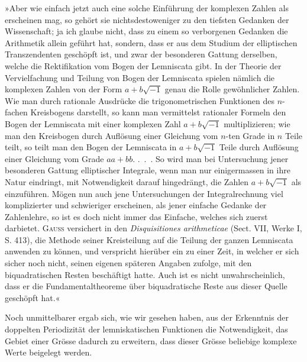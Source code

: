 »Aber wie einfach jetzt auch eine solche Einführung der komplexen Zahlen
als  erscheinen mag, so gehört sie nichtsdestoweniger zu den tiefsten
Gedanken der Wissenschaft; ja ich glaube nicht, dass zu einem so verborgenen
Gedanken die Arithmetik allein geführt hat, sondern, dass er aus dem Studium
der elliptischen Transzendenten geschöpft ist, und zwar der besonderen Gattung
derselben, welche die Rektifikation vom Bogen der Lemniscata gibt. In der
Theorie der Vervielfachung und Teilung von Bogen der Lemniscata spielen
nämlich die komplexen Zahlen von der Form \(a+b\sqrt{-1}\) genau die Rolle gewöhnlicher
Zahlen. Wie man durch rationale Ausdrücke die trigonometrischen
Funktionen des \(n\)-fachen Kreisbogens darstellt, so kann man vermittelst rationaler
Formeln den Bogen der Lemniscata mit einer komplexen Zahl \(a+b\sqrt{-1}\)
multiplizieren; wie man den Kreisbogen durch Auflösung einer Gleichung
vom \(n\)-ten Grade in \(n\) Teile teilt, so teilt man den Bogen der Lemniscata in
\(a+b\sqrt{-1}\) Teile durch Auflösung einer Gleichung vom Grade \(aa+bb\). .\ .\ .
So wird man bei Untersuchung jener besonderen Gattung elliptischer Integrale,
wenn man nur einigermassen in ihre Natur eindringt, mit Notwendigkeit
darauf hingedrängt, die Zahlen \(a+b\sqrt{-1}\) als  einzuführen.
Mögen nun auch jene Untersuchungen der Integralrechnung viel komplizierter
und schwieriger erscheinen, als jener einfache Gedanke der Zahlenlehre, so
ist es doch nicht immer das Einfache, welches sich zuerst darbietet. \textsc{Gauss}
versichert in den \textit{Disquisitiones arithmeticae} (Sect. VII, Werke I, S. 413), die
Methode seiner Kreisteilung auf die Teilung der ganzen Lemniscata anwenden
zu können, und verspricht hierüber ein  zu einer Zeit, in
welcher er sich sicher noch nicht, seinen eigenen späteren Angaben zufolge,
mit den biquadratischen Resten beschäftigt hatte. Auch ist es nicht unwahrscheinlich,
dass er die Fundamentaltheoreme über biquadratische Reste aus
dieser Quelle geschöpft hat.«\par
\clearpage{}
Noch unmittelbarer ergab sich, wie wir gesehen haben, aus der Erkenntnis
der doppelten Periodizität der lemniskatischen Funktionen die Notwendigkeit,
das Gebiet einer  Grösse dadurch zu erweitern, dass dieser
Grösse beliebige komplexe Werte beigelegt werden.

